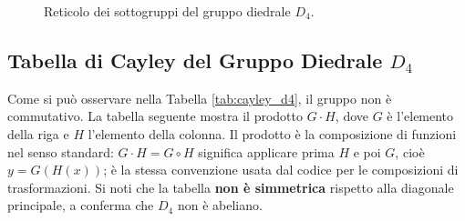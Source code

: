 \begin{figure}[h!]
    \centering


    \caption{Reticolo dei sottogruppi del gruppo diedrale $D_4$.}
    \label{fig:reticoloD4}
\end{figure}

\subsection{Tabella di Cayley del Gruppo Diedrale $D_4$}
Come si può osservare nella Tabella \ref{tab:cayley_d4}, il gruppo non è commutativo.
La tabella seguente mostra il prodotto $G \cdot H$, dove $G$ è l'elemento della riga e $H$ l'elemento della colonna.
Il prodotto è la composizione di funzioni nel senso standard: $G \cdot H = G \circ H$ significa applicare prima $H$ e poi $G$,
cioè $y = G(H(x))$; è la stessa convenzione usata dal codice per le composizioni di trasformazioni.
Si noti che la tabella \textbf{non è simmetrica} rispetto alla diagonale principale, a conferma che $D_4$ non è abeliano.

